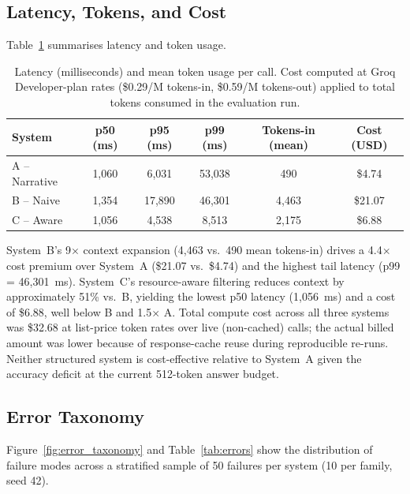 \subsection{Latency, Tokens, and Cost}
\label{sec:results:latency}

Table~\ref{tab:latency} summarises latency and token usage.

\begin{table}[!htbp]
\centering
\caption{Latency (milliseconds) and mean token usage per call.
Cost computed at Groq Developer-plan rates (\$0.29/M tokens-in, \$0.59/M tokens-out)
applied to total tokens consumed in the evaluation run.}
\label{tab:latency}
\begin{tabular}{lccccc}
\toprule
System & p50 (ms) & p95 (ms) & p99 (ms) & Tokens-in (mean) & Cost (USD) \\
\midrule
A -- Narrative  & 1,060 & 6,031  & 53,038 &   490 & \$4.74 \\
B -- Naive      & 1,354 & 17,890 & 46,301 & 4,463 & \$21.07 \\
C -- Aware      & 1,056 & 4,538  &  8,513 & 2,175 & \$6.88 \\
\bottomrule
\end{tabular}
\end{table}

System~B's 9$\times$ context expansion (4,463 vs.\ 490 mean tokens-in) drives a
4.4$\times$ cost premium over System~A (\$21.07 vs.\ \$4.74) and the highest
tail latency (p99 = 46,301~ms).  System~C's resource-aware filtering reduces context
by approximately 51\% vs.\ B, yielding the lowest p50 latency (1,056~ms) and a cost
of \$6.88, well below B and 1.5$\times$ A.  Total compute cost across all three
systems was \$32.68 at list-price token rates over live (non-cached) calls; the
actual billed amount was lower because of response-cache reuse during reproducible
re-runs.  Neither structured system is cost-effective relative to System~A given
the accuracy deficit at the current 512-token answer budget.

\subsection{Error Taxonomy}
\label{sec:results:errors}

Figure~\ref{fig:error_taxonomy} and Table~\ref{tab:errors} show the distribution of
failure modes across a stratified sample of 50 failures per system (10 per family, seed 42).


